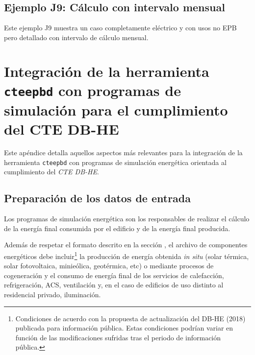 \documentclass[10pt,notitlepage,oneside,a4paper]{article}
\begin{document}




\subsection{Ejemplo J9: Cálculo con intervalo mensual}
Este ejemplo J9 muestra un caso completamente eléctrico y con usos no EPB pero detallado con intervalo de cálculo mensual.





\clearpage
\newpage
\section{Integración de la herramienta \texttt{cteepbd} con programas de simulación para el cumplimiento del CTE DB-HE}
\label{sec:anexointegracion}
\setcounter{figure}{0} %
\setcounter{table}{0} %

Este apéndice detalla aquellos aspectos más relevantes para la integración de la herramienta \texttt{cteepbd} con programas de simulación energética orientada al cumplimiento del \textit{CTE DB-HE}.

\subsection{Preparación de los datos de entrada}

Los programas de simulación energética son los responsables de realizar el cálculo de la energía final consumida por el edificio y de la energía final producida.

Además de respetar el formato descrito en la sección \textit{}, el archivo de componentes energéticos debe incluir\footnote{Condiciones de acuerdo con la propuesta de actualización del DB-HE (2018) publicada para información pública. Estas condiciones podrían variar en función de las modificaciones sufridas tras el periodo de información pública.} la producción de energía obtenida \textit{in situ} (solar térmica, solar fotovoltaica, minieólica, geotérmica, etc) o mediante procesos de cogeneración y el consumo de energía final de los servicios de calefacción, refrigeración, ACS, ventilación y, en el caso de edificios de uso distinto al residencial privado, iluminación.
\end{document}
